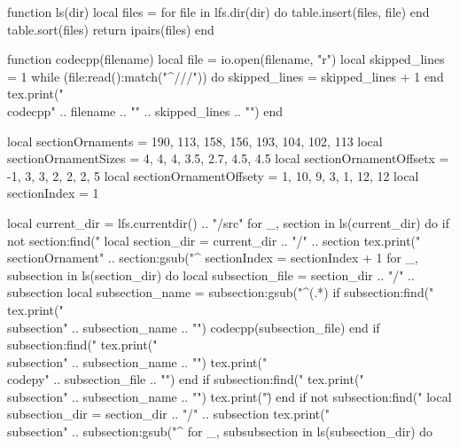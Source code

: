 \documentclass[8pt,a4paper,landscape,oneside]{amsart}
\newcommand{\codecpp}[2]{\inputminted[firstline=#2]{cpp}{'\detokenize{#1}'}}
\newcommand{\codepy}[1]{\inputminted{python}{'\detokenize{#1}'}}
\newcommand{\sectionOrnament}[5]{
    \section{#1}
    \vspace{-1.3em}
    \begin{center}
        \;\rput[r](- #4 pt, #5 pt){\pgfornament[height= #3 em]{#2}}
        \phantom{1. #1}\quad
        \rput[l](#4 pt, #5 pt){\pgfornament[height= #3 em,symmetry=v]{#2}}
    \end{center}
}
\begin{document}
\begin{multicols*}{3}
\begin{luacode*}
function ls(dir)
    local files = {}
    for file in lfs.dir(dir) do
        table.insert(files, file)
    end
    table.sort(files)
    return ipairs(files)
end

function codecpp(filename)
    local file = io.open(filename, "r")
    local skipped_lines = 1
    while (file:read():match("^///")) do
        skipped_lines = skipped_lines + 1
    end
    tex.print("\\codecpp{" .. filename .. "}{" .. skipped_lines .. "}")
end

local sectionOrnaments = {190, 113, 158, 156, 193, 104, 102, 113}
local sectionOrnamentSizes = {4, 4, 4, 3.5, 2.7, 4.5, 4.5}
local sectionOrnamentOffsetx = {-1, 3, 3, 2, 2, 2, 5}
local sectionOrnamentOffsety = {1, 10, 9, 3, 1, 12, 12}
local sectionIndex = 1

local current_dir = lfs.currentdir() .. "/src"
for _, section in ls(current_dir) do
    if not section:find("%
        local section_dir = current_dir .. "/" .. section
        tex.print("\\sectionOrnament{" .. section:gsub("^%
        sectionIndex = sectionIndex + 1
        for _, subsection in ls(section_dir) do
            local subsection_file = section_dir .. "/" .. subsection
            local subsection_name = subsection:gsub("^(.*)%
            if subsection:find("%
                tex.print("\\subsection{" .. subsection_name .. "}")
                codecpp(subsection_file)
            end
            if subsection:find("%
                tex.print("\\subsection{" .. subsection_name .. "}")
                tex.print("\\codepy{" .. subsection_file .. "}")
            end
            if subsection:find("%
                tex.print("\\subsection{" .. subsection_name .. "}")
                tex.print("\")
            end
            if not subsection:find("%
                local subsection_dir = section_dir .. "/" .. subsection
                tex.print("\\subsection{" .. subsection:gsub("^%
                for _, subsubsection in ls(subsection_dir) do
}}
\end{luacode*}
\end{multicols*}
\end{document}
